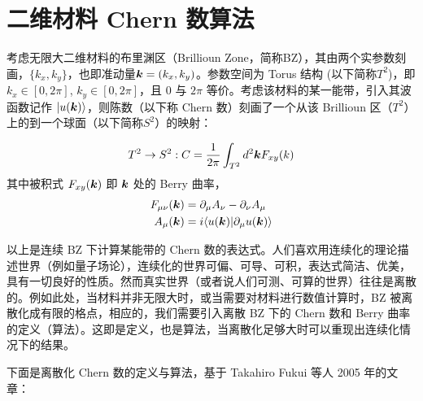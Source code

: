 
\chapter{二维材料 Chern 数算法}

考虑无限大二维材料的布里渊区（Brillioun Zone，简称BZ），其由两个实参数刻画，$\{k_x, k_y\}$，也即准动量$\boldsymbol{k}=(k_x, k_y)$。参数空间为 Torus 结构 (以下简称$T^2$)，即 $k_x\in[0, 2\pi]$, $k_y\in[0, 2\pi]$，且 0 与 $2\pi$ 等价。考虑该材料的某一能带，引入其波函数记作 $|u(\boldsymbol{k})\rangle$，则陈数（以下称 Chern 数）刻画了一个从该 Brillioun 区（$T^2$）上的到一个球面（以下简称$S^2$）的映射：

\begin{align}
T^2 \rightarrow S^2 : C = \frac{1}{2\pi}\int_{T^2}d^2\boldsymbol{k} F_{xy}(k)
\end{align}
其中被积式 $F_{xy}(\boldsymbol{k})$ 即 $\boldsymbol{k}$ 处的 Berry 曲率，
\begin{align}
F_{\mu\nu}(\boldsymbol{k})&=\partial_{\mu}A_{\nu} - \partial_{\nu}A_{\mu} \\ 
A_{\mu}(\boldsymbol{k})&=i\langle u(\boldsymbol{k})|\partial_{\mu}u(\boldsymbol{k})\rangle
\end{align}

以上是连续 BZ 下计算某能带的 Chern 数的表达式。人们喜欢用连续化的理论描述世界（例如量子场论），连续化的世界可偏、可导、可积，表达式简洁、优美，具有一切良好的性质。然而真实世界（或者说人们可测、可算的世界）往往是离散的。例如此处，当材料并非无限大时，或当需要对材料进行数值计算时，BZ 被离散化成有限的格点，相应的，我们需要引入离散 BZ 下的 Chern 数和 Berry 曲率的定义（算法）。这即是定义，也是算法，当离散化足够大时可以重现出连续化情况下的结果。

下面是离散化 Chern 数的定义与算法，基于 Takahiro Fukui 等人 2005 年的文章：

